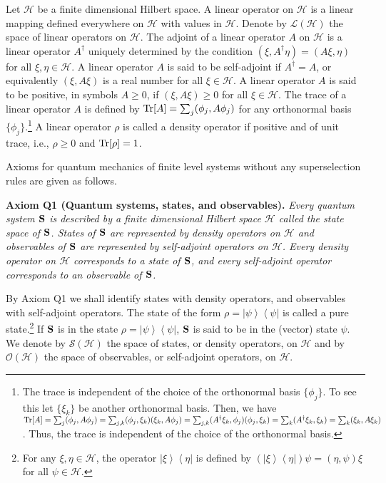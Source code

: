 \documentclass[graybox]{svmult}
\newcommand{\bS}{{\bf S}}
\newcommand{\cH}{{\mathcal H}}
\newcommand{\cL}{{\mathcal L}}
\newcommand{\cO}{{\mathcal O}}
\newcommand{\cS}{{\mathcal S}}
\newcommand{\da}{\dagger}
\newcommand{\et}{\eta}
\newcommand{\ph}{\phi}
\def\ps{\psi}
\newcommand{\rh}{\rho}
\newcommand{\Tr}{\mbox{\rm Tr}}
\newcommand{\bra}[1]{\left\langle#1\right|}
\newcommand{\ket}[1]{\left|#1\right\rangle}
\begin{document}
Let  $\cH$  be a finite dimensional Hilbert space.  A linear operator on $\cH$ is
a linear mapping defined everywhere on $\cH$ with values in $\cH$.
Denote by $\cL(\cH)$ the space of linear operators on $\cH$.
The adjoint of a linear operator $A$ on $\cH$ is a linear operator $A^{\da}$ uniquely
determined by the condition $(\xi,A^{\da}\et)=(A\xi,\et)$ for all $\xi,\et\in\cH$.
A linear operator $A$ is said to be self-adjoint if $A^{\da}=A$, or equivalently
$(\xi,A\xi)$ is a real number for all $\xi\in\cH$.
A linear operator $A$ is said to be positive, in symbols $A\ge 0$, if $(\xi,A\xi)\ge 0$ for all $\xi\in\cH$.
The trace of a linear operator $A$ is defined by  $\Tr[A]=\sum_{j}(\ph_j,A\ph_j)$ for
any orthonormal basis $\{\ph_j\}$.\footnote{
The trace is independent of the choice of the orthonormal basis $\{\ph_j\}$.
To see this let $\{\xi_k\}$ be another orthonormal basis.  Then, we have
$\Tr[A]=\sum_{j}(\ph_j,A\ph_j)=\sum_{j,k}(\ph_j,\xi_k)(\xi_k,A\ph_j)=
\sum_{j,k}(A^{\da}\xi_k,\ph_j)(\ph_j,\xi_k)=\sum_{k}(A^{\da}\xi_k,\xi_k)
=\sum_{k}(\xi_k,A\xi_k)$.  Thus, the trace is independent of the choice of the
orthonormal basis.}
A linear operator $\rh$ is called a density operator if positive and of unit trace, i.e., 
$\rh\ge 0$ and $\Tr[\rh]=1$.  

Axioms for quantum mechanics of finite level systems without any superselection rules 
are given as follows.
\bigskip

{\bf Axiom Q1 (Quantum systems, states, and observables).}
{\em Every quantum system $\bS$ is described by a finite dimensional 
Hilbert space ${\mathcal H}$ called the {\em state space} of $\bS$. 
{\em States} of\/ $\bS$ are represented by density
operators on $\cH$ and {\em observables} 
of $\bS$ are represented by self-adjoint operators on $\cH$.
Every density operator on $\cH$ corresponds to a state of\/ $\bS$,
and every self-adjoint operator corresponds to an observable of\/ $\bS$.}
\bigskip



By Axiom Q1 we shall identify states with density operators,
and observables with self-adjoint operators.  The state of the form
$\rh=\ket{\ps}\bra{\ps}$ is called a {pure state}.\footnote{
For any $\xi,\et\in\cH$,  the operator $\ket{\xi}\bra{\et}$ is defined by
$(\ket{\xi}\bra{\et})\ps=(\et,\ps)\xi$ for all $\ps\in\cH$.
} 
If $\bS$ is in the state $\rh=\ket{\ps}\bra{\ps}$,
$\bS$ is said to be in the (vector) state $\ps$.
We denote by $\cS(\cH)$ the space of states, or density operators,  on $\cH$
and by $\cO(\cH)$ the space of observables, or self-adjoint operators,  on $\cH$. 
\bigskip
\end{document}
